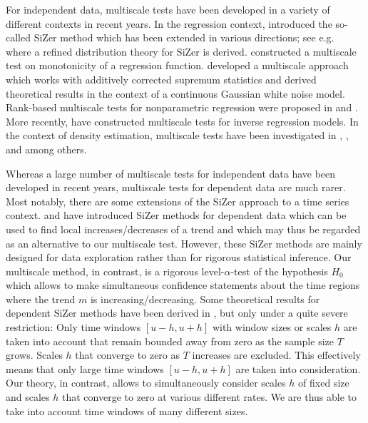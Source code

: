 For independent data, multiscale tests have been developed in a variety of different contexts in recent years. In the regression context, \cite{ChaudhuriMarron1999,ChaudhuriMarron2000} introduced the so-called SiZer method which has been extended in various directions; see e.g.\ \cite{HannigMarron2006} where a refined distribution theory for SiZer is derived. \cite{HallHeckman2000} constructed a multiscale test on monotonicity of a regression function. \cite{DuembgenSpokoiny2001} developed a multiscale approach which works with additively corrected supremum statistics and derived theoretical results in the context of a continuous Gaussian white noise model. Rank-based multiscale tests for nonparametric regression were proposed in \cite{Duembgen2002} and \cite{Rohde2008}. More recently, \cite{ProkschWernerMunk2018} have constructed multiscale tests for inverse regression models. In the context of density estimation, multiscale tests have been investigated in \cite{DuembgenWalther2008}, \cite{RufibachWalther2010}, \cite{SchmidtHieber2013} and \cite{EckleBissantzDette2017} among others. 


Whereas a large number of multiscale tests for independent data have been developed in recent years, multiscale tests for dependent data are much rarer. Most notably, there are some extensions of the SiZer approach to a time series context. \cite{Rondonotti2004} and \cite{Rondonotti2007} have introduced SiZer methods for dependent data which can be used to find local increases/decreases of a trend and which may thus be regarded as an alternative to our multiscale test. However, these SiZer methods are mainly designed for data exploration rather than for rigorous statistical inference. Our multiscale method, in contrast, is a rigorous level-$\alpha$-test of the hypo\-thesis $H_0$ which allows to make simultaneous confidence statements about the time regions where the trend $m$ is increasing/decreasing. Some theoretical results for dependent SiZer methods have been derived in \cite{ParkHannigKang2009}, but only under a quite severe restriction: Only time windows $[u-h,u+h]$ with window sizes or scales $h$ are taken into account that remain bounded away from zero as the sample size $T$ grows. Scales $h$ that converge to zero as $T$ increases are excluded. This effectively means that only large time windows $[u-h,u+h]$ are taken into consideration. Our theory, in contrast, allows to simultaneously consider scales $h$ of fixed size and scales $h$ that converge to zero at various different rates. We are thus able to take into account time windows of many different sizes. 



